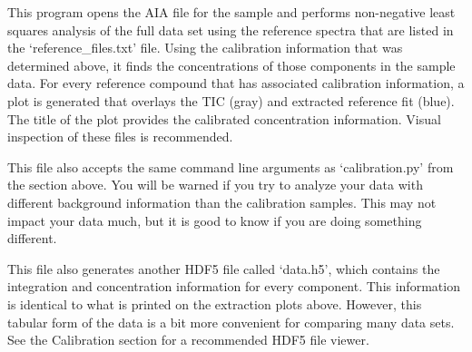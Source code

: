 \documentclass[letterpaper,10pt,english]{sphinxmanual}
\begin{document}
This program opens the AIA file for the sample and performs non-negative least
squares analysis of the full data set using the reference spectra that are
listed in the `reference\_files.txt' file. Using the calibration information
that was determined above, it finds the concentrations of those components in
the sample data. For every reference compound that has associated calibration
information, a plot is generated that overlays the TIC (gray) and extracted
reference fit (blue). The title of the plot provides the calibrated
concentration information. Visual inspection of these files is recommended.

This file also accepts the same command line arguments as `calibration.py'
from the section above. You will be warned if you try to analyze your data
with different background information than the calibration samples. This may
not impact your data much, but it is good to know if you are doing something
different.

This file also generates another HDF5 file called `data.h5', which contains
the integration and concentration information for every component. This
information is identical to what is printed on the extraction plots above.
However, this tabular form of the data is a bit more convenient for comparing
many data sets. See the Calibration section for a recommended HDF5 file
viewer.



\renewcommand{\indexname}{Index}
\printindex
\end{document}

